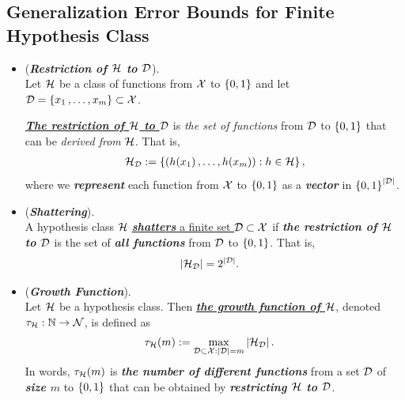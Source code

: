 \documentclass[11pt]{article}
\begin{document}
\subsection{Generalization Error Bounds for Finite Hypothesis Class}
\begin{itemize}
\item \begin{definition} (\emph{\textbf{Restriction of ${\mathcal H}$ to ${\mathcal D}$}}). \\
Let ${\mathcal H}$ be a class of functions from ${\mathcal X}$ to $\left\{0,1\right\}$ and let ${\mathcal D} = \left\{x_1 \,{,}\ldots{,}\, x_m\right\} \subset {\mathcal X}$. 

\underline{\emph{\textbf{The restriction of ${\mathcal H}$ to ${\mathcal D}$}}} is \emph{the set of functions} from ${\mathcal D}$ to $\left\{0,1\right\}$ that can be \emph{derived from} ${\mathcal H}$. That is,
\begin{align*}
{\mathcal H}_{{\mathcal D}} := \left\{(h(x_1) \,{,}\ldots{,}\, h(x_m)): h \in {\mathcal H}\right\},
\end{align*}
where we \emph{\textbf{represent}} each function from ${\mathcal X}$ to $\left\{0,1\right\}$ as a \emph{\textbf{vector}} in $\left\{0,1\right\}^{\left\lvert {\mathcal D} \right\rvert}$.
\end{definition}

\item \begin{definition}(\emph{\textbf{Shattering}}). \\
A hypothesis class ${\mathcal H}$ \underline{\emph{\textbf{shatters}} a finite set ${\mathcal D} \subset {\mathcal X}$} if \emph{\textbf{the restriction of ${\mathcal H}$ to ${\mathcal D}$}} is the set of \emph{\textbf{all functions}} from ${\mathcal D}$ to $\left\{0,1\right\}$. That is, 
\begin{align*}
\left\lvert {\mathcal H}_{{\mathcal D}} \right\rvert &= 2^{\left\lvert {\mathcal D} \right\rvert}.
\end{align*}
\end{definition}

\item \begin{definition} (\emph{\textbf{Growth Function}}). \\
Let ${\mathcal H}$ be a hypothesis class. Then \underline{\emph{\textbf{the growth function of ${\mathcal H}$}}}, denoted $\tau_{{\mathcal H}}: {\mathbb N} \to {\mathcal N}$, is defined as
\begin{align*}
\tau_{{\mathcal H}}(m) &:= \max_{{\mathcal D} \subset {\mathcal X}: \left\lvert {\mathcal D} \right\rvert = m}\left\lvert {\mathcal H}_{{\mathcal D}} \right\rvert.
\end{align*}
In words, $\tau_{{\mathcal H}}(m)$ is \textbf{\emph{the number of different functions}} from a set ${\mathcal D}$ of \emph{\textbf{size $m$}} to $\left\{0,1\right\}$ that can be obtained by \emph{\textbf{restricting ${\mathcal H}$ to ${\mathcal D}$}}.
\end{definition}


\end{itemize}
\end{document}
